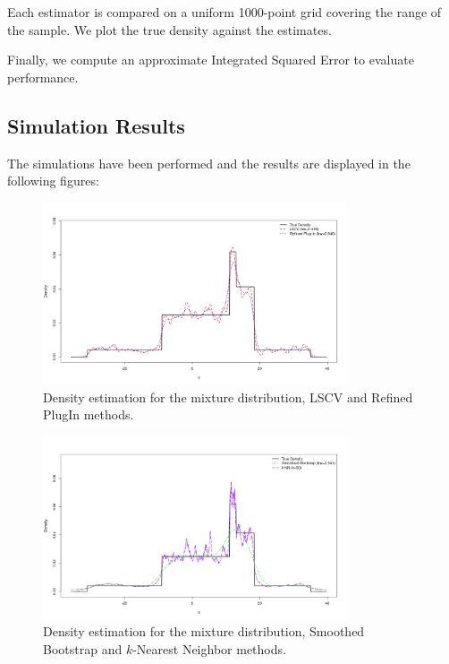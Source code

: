 \documentclass{article}
\begin{document}
Each estimator is compared on a uniform 1000-point grid covering the range of the sample. We plot the true density against the estimates.

Finally, we compute an approximate Integrated Squared Error to evaluate performance.

\subsection{Simulation Results}

The simulations have been performed and the results are displayed in the following figures:

\begin{figure}[H]
  \centering
  \includegraphics[width=0.8\textwidth]{density_estimation_comparison_p1.png}
  \caption{Density estimation for the mixture distribution, LSCV and Refined Plug\-In methods.}
\end{figure}

\begin{figure}[H]
  \centering
  \includegraphics[width=0.8\textwidth]{density_estimation_comparison_p2.png}
  \caption{Density estimation for the mixture distribution, Smoothed Bootstrap and \(k\)-Nearest Neighbor methods.}
\end{figure}
\end{document}
